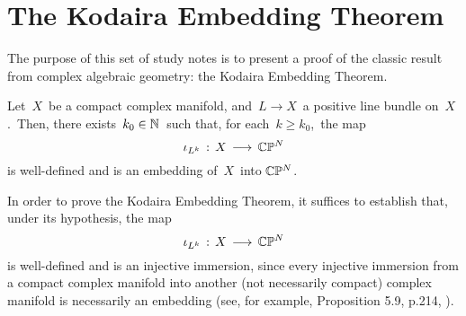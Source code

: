 

\section{The Kodaira Embedding Theorem}
\setcounter{theorem}{0}
\setcounter{equation}{0}


\renewcommand{\theenumi}{\roman{enumi}}
\renewcommand{\labelenumi}{\textnormal{(\theenumi)}$\;\;$}


The purpose of this set of study notes is to present a proof
of the classic result from complex algebraic geometry:
the Kodaira Embedding Theorem.

\begin{theorem}
\mbox{}
\vskip 0.1cm
\noindent
Let \,$X$\, be a compact complex manifold,
and \,$L \longrightarrow X$\, a positive line bundle on \,$X$.\,
Then, there exists \,$k_{0} \in \mathbb{N}$\, such that, for each \,$k \geq k_{0}$,\,
the map
\begin{equation*}
\iota_{L^{k}} \, : \, X \, \longrightarrow \, \mathbb{C}\mathbb{P}^{N}
\end{equation*}
is well-defined and is an embedding of \,$X$\, into $\mathbb{C}\mathbb{P}^{N}$.
\end{theorem}


\proofoutline
\vskip 0.2cm
\noindent
In order to prove the Kodaira Embedding Theorem, it suffices to establish that,
under its hypothesis, the map
\begin{equation*}
\iota_{L^{k}} \, : \, X \, \longrightarrow \, \mathbb{C}\mathbb{P}^{N}
\end{equation*}
is well-defined and is an {\color{red}injective immersion}, since every injective immersion from a compact complex manifold
into another (not necessarily compact) complex manifold is necessarily an embedding
(see, for example, Proposition 5.9, p.214, \cite{FritzscheGrauert2002}).

